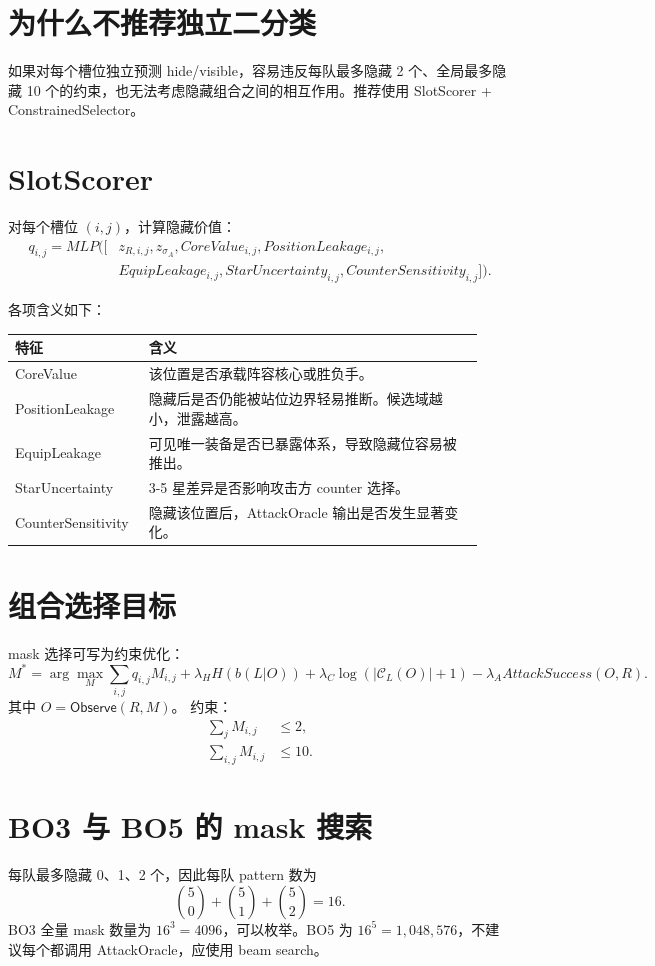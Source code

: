 \documentclass[UTF8,12pt,openany]{ctexbook}
\newcommand{\Ccal}{\mathcal{C}}
\newcommand{\Observe}{\mathsf{Observe}}
\begin{document}
\section{为什么不推荐独立二分类}
如果对每个槽位独立预测 hide/visible，容易违反每队最多隐藏 2 个、全局最多隐藏 10 个的约束，也无法考虑隐藏组合之间的相互作用。推荐使用 SlotScorer + ConstrainedSelector。

\section{SlotScorer}
对每个槽位 $(i,j)$，计算隐藏价值：
\begin{equation}
\begin{aligned}
q_{i,j}=MLP([&z_{R,i,j},z_{\sigma_A},CoreValue_{i,j},PositionLeakage_{i,j},\\
&EquipLeakage_{i,j},StarUncertainty_{i,j},CounterSensitivity_{i,j}]).
\end{aligned}
\end{equation}

各项含义如下：
\begin{longtable}{p{0.25\linewidth}p{0.68\linewidth}}
\toprule
特征 & 含义 \\
\midrule
CoreValue & 该位置是否承载阵容核心或胜负手。\\
PositionLeakage & 隐藏后是否仍能被站位边界轻易推断。候选域越小，泄露越高。\\
EquipLeakage & 可见唯一装备是否已暴露体系，导致隐藏位容易被推出。\\
StarUncertainty & 3-5 星差异是否影响攻击方 counter 选择。\\
CounterSensitivity & 隐藏该位置后，AttackOracle 输出是否发生显著变化。\\
\bottomrule
\end{longtable}

\section{组合选择目标}
mask 选择可写为约束优化：
\begin{equation}
M^*=\arg\max_M\sum_{i,j}q_{i,j}M_{i,j}+\lambda_HH(b(L|O))+\lambda_C\log(|\Ccal_L(O)|+1)-\lambda_AAttackSuccess(O,R).
\end{equation}
其中 $O=\Observe(R,M)$。
约束：
\begin{align}
\sum_jM_{i,j}&\le 2,\\
\sum_{i,j}M_{i,j}&\le 10.
\end{align}

\section{BO3 与 BO5 的 mask 搜索}
每队最多隐藏 0、1、2 个，因此每队 pattern 数为
\begin{equation}
\binom{5}{0}+\binom{5}{1}+\binom{5}{2}=16.
\end{equation}
BO3 全量 mask 数量为 $16^3=4096$，可以枚举。BO5 为 $16^5=1,048,576$，不建议每个都调用 AttackOracle，应使用 beam search。
\end{document}
